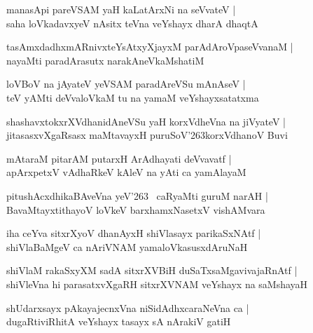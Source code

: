 \documentclass[twoside,12pt,openright]{book}
\def\S{\char'263}
\newcounter{shloka}[chapter]
\begin{document}
\begin{shloka}
manasApi pareVSAM yaH kaLatArxNi na seVvateV |\\
saha loVkadavxyeV nAsitx teVna veYshayx dharA dhaqtA 
\end{shloka}

\begin{shloka}
tasAmxdadhxmARnivxteYsAtxyXjayxM parAdAroVpaseVvanaM |\\
nayaMti paradArasutx narakAneVkaMshatiM 
\end{shloka}

\begin{shloka}
loVBoV na jAyateV yeVSAM paradAreVSu mAnAseV |\\
teV yAMti deVvaloVkaM tu na yamaM veYshayxsatatxma 
\end{shloka}

\begin{shloka}
shashavxtokxrXVdhanidAneVSu yaH korxVdheVna na jiVyateV |\\
jitasasxvXgaRsasx maMtavayxH puruSoV\S korxVdhanoV Buvi 
\end{shloka}

\begin{shloka}
mAtaraM pitarAM putarxH ArAdhayati deVvavatf |\\
apArxpetxV vAdhaRkeV kAleV na yAti ca yamAlayaM 
\end{shloka}

\begin{shloka}
pitushAcxdhikaBAveVna yeV\S ~ caRyaMti guruM narAH |\\
BavaMtayxtithayoV loVkeV barxhamxNasetxV vishAMvara
\end{shloka}

\begin{shloka}
iha ceYva sitxrXyoV dhanAyxH shiVlasayx parikaSxNAtf |\\
shiVlaBaMgeV ca nAriVNAM yamaloVkasusxdAruNaH 
\end{shloka}

\begin{shloka}
shiVlaM rakaSxyXM sadA sitxrXVBiH duSaTxsaMgavivajaRnAtf |\\
shiVleVna hi parasatxvXgaRH sitxrXVNAM veYshayx na saMshayaH 
\end{shloka}

\begin{shloka}
shUdarxsayx pAkayajecnxVna niSidAdhxcaraNeVna ca |\\
dugaRtiviRhitA veYshayx tasayx sA nArakiV gatiH 
\end{shloka}
\end{document}
